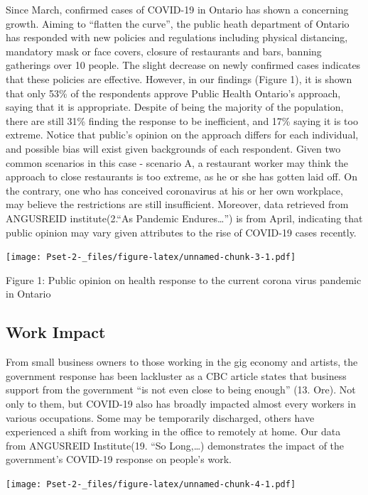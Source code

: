\documentclass[
]{article}
\begin{document}
Since March, confirmed cases of COVID-19 in Ontario has shown a
concerning growth. Aiming to ``flatten the curve'', the public heath
department of Ontario has responded with new policies and regulations
including physical distancing, mandatory mask or face covers, closure of
restaurants and bars, banning gatherings over 10 people. The slight
decrease on newly confirmed cases indicates that these policies are
effective. However, in our findings (Figure 1), it is shown that only
53\% of the respondents approve Public Health Ontario's approach, saying
that it is appropriate. Despite of being the majority of the population,
there are still 31\% finding the response to be inefficient, and 17\%
saying it is too extreme. Notice that public's opinion on the approach
differs for each individual, and possible bias will exist given
backgrounds of each respondent. Given two common scenarios in this case
- scenario A, a restaurant worker may think the approach to close
restaurants is too extreme, as he or she has gotten laid off. On the
contrary, one who has conceived coronavirus at his or her own workplace,
may believe the restrictions are still insufficient. Moreover, data
retrieved from ANGUSREID institute(2.``As Pandemic Endures\ldots{}'') is
from April, indicating that public opinion may vary given attributes to
the rise of COVID-19 cases recently.

\texttt{[image: Pset-2-\_files/figure-latex/unnamed-chunk-3-1.pdf]}

Figure 1: Public opinion on health response to the current corona virus
pandemic in Ontario

\hypertarget{work-impact}{%
\subsection{Work Impact}\label{work-impact}}

From small business owners to those working in the gig economy and
artists, the government response has been lackluster as a CBC article
states that business support from the government ``is not even close to
being enough'' (13. Ore). Not only to them, but COVID-19 also has
broadly impacted almost every workers in various occupations. Some may
be temporarily discharged, others have experienced a shift from working
in the office to remotely at home. Our data from ANGUSREID Institute(19.
``So Long,\ldots) demonstrates the impact of the government's COVID-19
response on people's work.

\texttt{[image: Pset-2-\_files/figure-latex/unnamed-chunk-4-1.pdf]}
\end{document}
